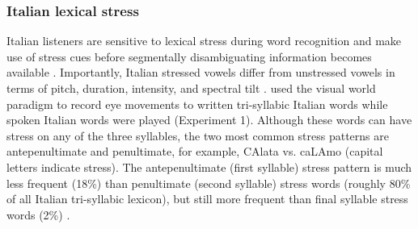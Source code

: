 \subsubsection{Italian lexical stress}
Italian listeners are sensitive to lexical stress during word recognition and make use of stress cues before segmentally disambiguating information becomes available \citep{Tagliapietra2005, Sulpizio_McQueen_2012}. Importantly, Italian stressed vowels differ from unstressed vowels in terms of pitch, duration, intensity, and spectral tilt \citep{Maturi1998}. \cite{Sulpizio_McQueen_2012} used the visual world paradigm to record eye movements to written tri-syllabic Italian words while spoken Italian words were played (Experiment 1). Although these words can have stress on any of the three syllables, the two most common stress patterns are antepenultimate and penultimate, for example, CAlata vs. caLAmo (capital letters indicate stress). The antepenultimate (first syllable) stress pattern is much less frequent (18\%) than penultimate (second syllable) stress words (roughly 80\% of all Italian tri-syllabic lexicon), but still more frequent than final syllable stress words (2\%) \citep{thornton_1997}. 

